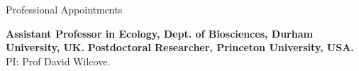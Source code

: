 \begin{rubric}{Professional Appointments}

%
	\textbf{Assistant Professor in Ecology, Dept. of Biosciences, Durham University, UK.}
%
\entry*[2019 -- 2021]%
	\textbf{Postdoctoral Researcher, Princeton University, USA.} PI: Prof David Wilcove.
%
\end{rubric}